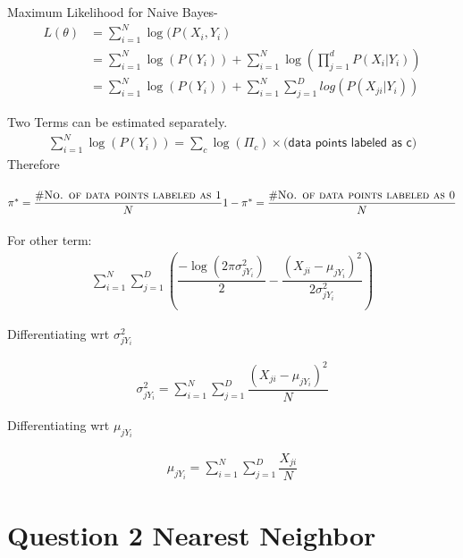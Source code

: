 \documentclass[paper=a4, fontsize=11pt]{scrartcl} %
\numberwithin{equation}{section} %
\numberwithin{figure}{section} %
\numberwithin{table}{section} %
\begin{document}
Maximum Likelihood for Naive Bayes- 
\begin{align*} 
L(\theta) &= \sum_{i=1}^{N} \log(P(X_{i},Y_{i})\\
&= \sum_{i=1}^{N} \log(P(Y_{i})) + \sum_{i=1}^{N}\log(\prod_{j=1}^{d}P(X_{i}|Y_{i}))\\
&= \sum_{i=1}^{N} \log(P(Y_{i})) + \sum_{i=1}^{N}\sum_{j=1}^{D}log(P(X_{ji}|Y_{i}))
\end{align*}

Two Terms can be estimated separately.
\begin{align*} 
\sum_{i=1}^{N} \log(P(Y_{i})) = \sum_{c}^{}\log(\Pi_{c}) \times \textsf{(data points labeled as c)}
\end{align*}
Therefore\\\\
\begin{math}
\pi^{*} = \dfrac{\#  \textsc{No. of data points labeled as 1}}{N}\\\\
1 - \pi^{*} = \dfrac{\# \textsc{No. of data points labeled as 0}}{N}
\end{math}
\\\\
For other term:
\begin{align*} 
\sum_{i=1}^{N} \sum_{j=1}^{D} (\dfrac{-\log(2\pi\sigma_{jY_{i}}^2)}{2} - \dfrac{(X_{ji} - \mu_{jY_{i}})^{2}}{2\sigma_{jY_{i}}^2})
\end{align*}

Differentiating wrt \begin{math} \sigma_{jY_{i}}^{2} \end{math}

\begin{align*} 
\sigma_{jY_{i}}^{2} = \sum_{i=1}^{N} \sum_{j=1}^{D} \dfrac{(X_{ji} -\mu_{jY_{i}})^{2}}{N}
\end{align*}

Differentiating wrt \begin{math} \mu_{jY_{i}} \end{math}

\begin{align*} 
\mu_{jY_{i}} = \sum_{i=1}^{N} \sum_{j=1}^{D} \dfrac{X_{ji}}{N}
\end{align*}


\section{Question 2 Nearest Neighbor}
\end{document}
